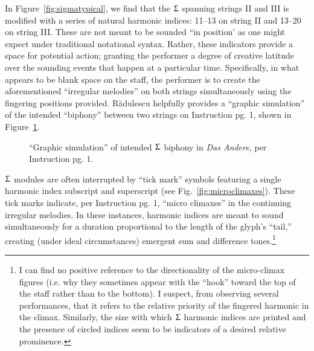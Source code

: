         In Figure~\ref{fig:sigmatypical}, we find that the $\Upsigma$ spanning strings II and III is modified with a series of natural harmonic indices: 11--13 on string II and 13--20 on string III. These are not meant to be sounded ``in position' as one might expect under traditional notational syntax. Rather, these indicators provide a space for potential action; granting the performer a degree of creative latitude over the sounding events that happen at a particular time. Specifically, in what appears to be blank space on the staff, the performer is to create the aforementioned ``irregular melodies'' on both strings simultaneously using the fingering positions provided. Rădulescu helpfully provides a ``graphic simulation'' of the intended ``biphony'' between two strings on Instruction pg. 1, shown in Figure~\ref{fig:graphicsimulation}.

    
            \begin{figure} 
                \centering
                \captionsetup{width=.51\textwidth}
                \caption{``Graphic simulation'' of intended $\Upsigma$ biphony in \textit{Das Andere}, per Instruction pg. 1.}
                \label{fig:graphicsimulation}
            \end{figure}
    
        $\Upsigma$ modules are often interrupted by ``tick mark'' symbols featuring a single harmonic index subscript and superscript (see Fig.~\ref{fig:microclimaxes}). These tick marks indicate, per Instruction pg. 1, ``micro climaxes'' in the continuing irregular melodies. In these instances, harmonic indices are meant to sound simultaneously for a duration proportional to the length of the glyph's ``tail,'' creating (under ideal circumstances) emergent sum and difference tones.\footnote{I can find no positive reference to the directionality of the micro-climax figures (i.e. why they sometimes appear with the ``hook'' toward the top of the staff rather than to the bottom). I suspect, from observing several performances, that it refers to the relative priority of the fingered harmonic in the climax. Similarly, the size with which $\Upsigma$ harmonic indices are printed and the presence of circled indices seem to be indicators of a desired relative prominence.}

